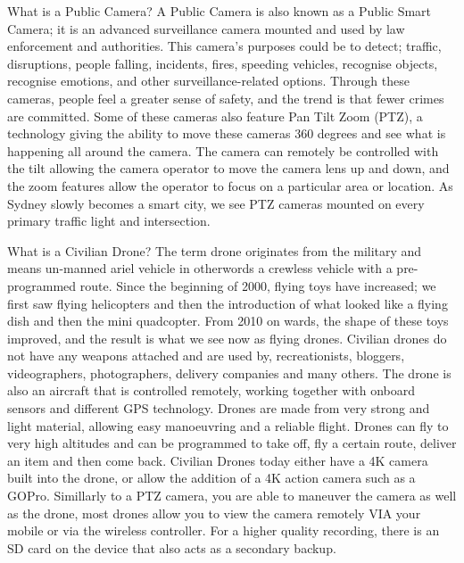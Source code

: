 What is a Public Camera?
A Public Camera is also known as a Public Smart Camera; it is an advanced surveillance camera mounted and used by law enforcement and authorities. This camera's purposes could be to detect; traffic, disruptions, people falling, incidents, fires, speeding vehicles, recognise objects, recognise emotions, and other surveillance-related options. Through these cameras, people feel a greater sense of safety, and the trend is that fewer crimes are committed. Some of these cameras also feature Pan Tilt Zoom (PTZ), a technology giving the ability to move these cameras 360 degrees and see what is happening all around the camera. The camera can remotely be controlled with the tilt allowing the camera operator to move the camera lens up and down, and the zoom features allow the operator to focus on a particular area or location. As Sydney slowly becomes a smart city, we see PTZ cameras mounted on every primary traffic light and intersection.
 
What is a Civilian Drone?
The term drone originates from the military and means un-manned ariel vehicle in otherwords a crewless vehicle with a pre-programmed route.  Since the beginning of 2000, flying toys have increased; we first saw flying helicopters and then the introduction of what looked like a flying dish and then the mini quadcopter.  From 2010 on wards, the shape of these toys improved, and the result is what we see now as flying drones. Civilian drones do not have any weapons attached and are used by, recreationists, bloggers, videographers, photographers, delivery companies and many others.  The drone is also an aircraft that is controlled remotely, working together with onboard sensors and different GPS technology. Drones are made from very strong and light material, allowing easy manoeuvring and a reliable flight. Drones can fly to very high altitudes and can be programmed to take off, fly a certain route, deliver an item and then come back. Civilian Drones today either have a 4K camera built into the drone, or allow the addition of a 4K action camera such as a GOPro. Simillarly to a PTZ camera, you are able to maneuver the camera as well as the drone, most drones allow you to view the camera remotely VIA your mobile or via the wireless controller. For a higher quality recording, there is an SD card on the device that also acts as a secondary backup. 
